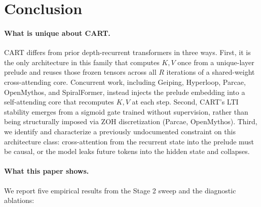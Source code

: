 \documentclass{article}
\newcommand{\cart}{\textsc{CART}}
\begin{document}
\section{Conclusion}
\label{sec:conclusion}

\paragraph{What is unique about \cart{}.}
\cart{} differs from prior depth-recurrent transformers in three ways. First, it is the only architecture in this family that computes $K, V$ once from a unique-layer prelude and reuses those frozen tensors across all $R$ iterations of a shared-weight cross-attending core. Concurrent work, including Geiping, Hyperloop, Parcae, OpenMythos, and SpiralFormer, instead injects the prelude embedding into a self-attending core that recomputes $K, V$ at each step. Second, \cart{}'s LTI stability emerges from a sigmoid gate trained without supervision, rather than being structurally imposed via ZOH discretization (Parcae, OpenMythos). Third, we identify and characterize a previously undocumented constraint on this architecture class: cross-attention from the recurrent state into the prelude must be causal, or the model leaks future tokens into the hidden state and collapses.

\paragraph{What this paper shows.}
We report five empirical results from the Stage 2 sweep and the diagnostic ablations:
\end{document}
